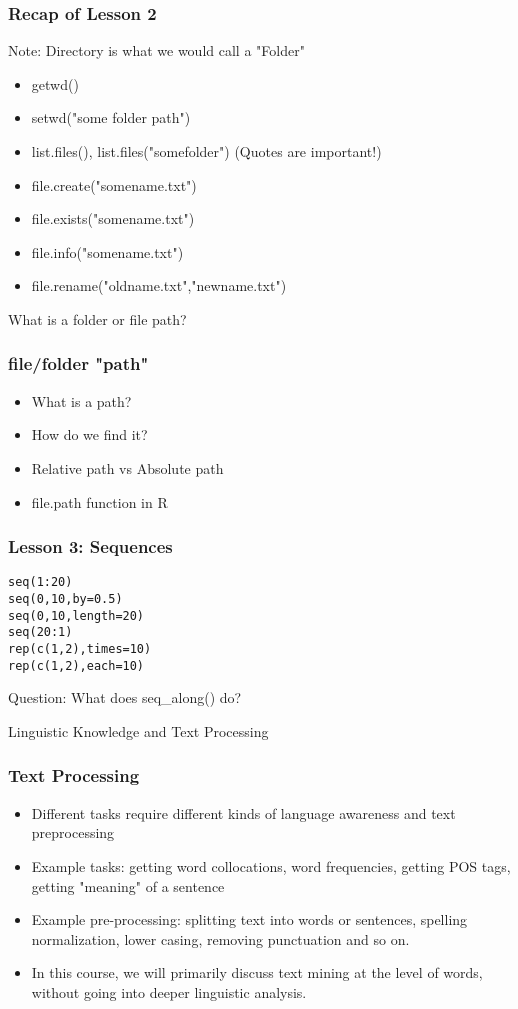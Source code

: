 \documentclass{beamer}
\begin{document}
\begin{frame}
\frametitle{Recap of Lesson 2}
Note: Directory is what we would call a "Folder"
\begin{itemize}
\item getwd()
\item setwd("some folder path")
\item list.files(), list.files("somefolder") (Quotes are important!)
\item file.create("somename.txt")
\item file.exists("somename.txt")
\item file.info("somename.txt")
\item file.rename("oldname.txt","newname.txt")
\end{itemize}
What is a folder or file path?
\end{frame}

\begin{frame}
\frametitle{file/folder "path"}
\begin{itemize}
\item What is a path? \pause
\item How do we find it? \pause
\item Relative path vs Absolute path \pause
\item file.path function in R \pause
\end{itemize}
\end{frame}

\begin{frame}[fragile]
\frametitle{Lesson 3: Sequences}
\begin{verbatim}
seq(1:20)
seq(0,10,by=0.5)
seq(0,10,length=20)
seq(20:1)
rep(c(1,2),times=10)
rep(c(1,2),each=10)
\end{verbatim}
Question: What does seq\_along() do?
\end{frame}

\begin{frame}
\Large Linguistic Knowledge and Text Processing
\end{frame}

\begin{frame}
\frametitle{Text Processing}
\begin{itemize}
\item Different tasks require different kinds of language awareness and text preprocessing
\item Example tasks: getting word collocations, word frequencies, getting POS tags, getting "meaning" of a sentence
\item Example pre-processing: splitting text into words or sentences, spelling normalization, lower casing, removing punctuation and so on.
\item In this course, we will primarily discuss text mining at the level of words, without going into deeper linguistic analysis.
\end{itemize}
\end{frame}
\end{document}
